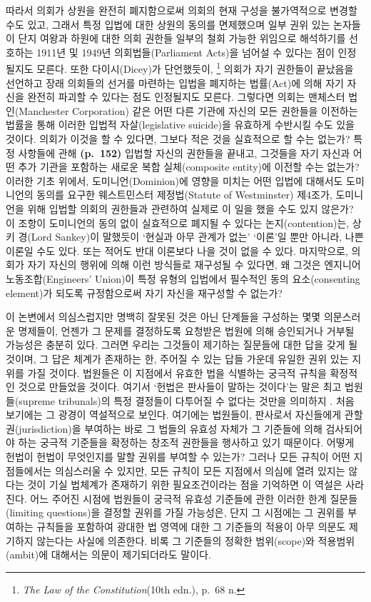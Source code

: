 따라서 의회가 상원을 완전히 폐지함으로써 의회의 현재 구성을 불가역적으로
변경할 수도 있고, 그래서 특정 입법에 대한 상원의 동의를 면제했으며 일부
권위 있는 논자들이 단지 여왕과 하원에 대한 의회 권한들 일부의 철회
가능한 위임으로 해석하기를 선호하는 1911년 및 1949년 의회법들(Parliament
Acts)을 넘어설 수 있다는 점이 인정될지도 모른다. 또한 다이시(Dicey)가
단언했듯이, \footnote{\emph{The Law of the Constitution}(10th edn.),
  p.~68 n.} 의회가 자기 권한들이 끝났음을 선언하고 장래 의회들의 선거를
마련하는 입법을 폐지하는 법률(Act)에 의해 자기 자신을 완전히 파괴할 수
있다는 점도 인정될지도 모른다. 그렇다면 의회는 맨체스터 법인(Manchester
Corporation) 같은 어떤 다른 기관에 자신의 모든 권한들을 이전하는 법률을
통해 이러한 입법적 자살(legislative suicide)을 유효하게 수반시킬 수도
있을 것이다. 의회가 이것을 할 수 있다면, 그보다 적은 것을 실효적으로 할
수는 없는가? 특정 사항들에 관해 \textbf{(p.~152)} 입법할 자신의 권한들을
끝내고, 그것들을 자기 자신과 어떤 추가 기관을 포함하는 새로운 복합
실체(composite entity)에 이전할 수는 없는가? 이러한 기초 위에서,
도미니언(Dominion)에 영향을 미치는 어떤 입법에 대해서도 도미니언의
동의를 요구한 웨스트민스터 제정법(Statute of Westminster) 제4조가,
도미니언을 위해 입법할 의회의 권한들과 관련하여 실제로 이 일을 했을 수도
있지 않은가? 이 조항이 도미니언의 동의 없이 실효적으로 폐지될 수 있다는
논지(contention)는, 상키 경(Lord Sankey)이 말했듯이 ‘현실과 아무 관계가
없는’ ‘이론’일 뿐만 아니라, 나쁜 이론일 수도 있다. 또는 적어도 반대
이론보다 나을 것이 없을 수 있다. 마지막으로, 의회가 자기 자신의 행위에
의해 이런 방식들로 재구성될 수 있다면, 왜 그것은 엔지니어
노동조합(Engineers' Union)이 특정 유형의 입법에서 필수적인 동의
요소(consenting element)가 되도록 규정함으로써 자기 자신을 재구성할 수
없는가?

이 논변에서 의심스럽지만 명백히 잘못된 것은 아닌 단계들을 구성하는 몇몇
의문스러운 명제들이, 언젠가 그 문제를 결정하도록 요청받은 법원에 의해
승인되거나 거부될 가능성은 충분히 있다. 그러면 우리는 그것들이 제기하는
질문들에 대한 답을 갖게 될 것이며, 그 답은 체계가 존재하는 한, 주어질 수
있는 답들 가운데 유일한 권위 있는 지위를 가질 것이다. 법원들은 이
지점에서 유효한 법을 식별하는 궁극적 규칙을 확정적인 것으로 만들었을
것이다. 여기서 ‘헌법은 판사들이 말하는 것이다’는 말은 최고
법원들(supreme tribunals)의 특정 결정들이 다투어질 수 없다는 것만을
의미하지 . 처음 보기에는 그 광경이 역설적으로 보인다.
여기에는 법원들이, 판사로서 자신들에게 관할권(jurisdiction)을 부여하는
바로 그 법들의 유효성 자체가 그 기준들에 의해 검사되어야 하는 궁극적
기준들을 확정하는 창조적 권한들을 행사하고 있기 때문이다. 어떻게 헌법이
헌법이 무엇인지를 말할 권위를 부여할 수 있는가? 그러나 모든 규칙이 어떤
지점들에서는 의심스러울 수 있지만, 모든 규칙이 모든 지점에서 의심에 열려
있지는 않다는 것이 기실 법체계가 존재하기 위한 필요조건이라는 점을
기억하면 이 역설은 사라진다. 어느 주어진 시점에 법원들이 궁극적 유효성
기준들에 관한 이러한 한계 질문들(limiting questions)을 결정할 권위를
가질 가능성은, 단지 그 시점에는 그 권위를 부여하는 규칙들을 포함하여
광대한 법 영역에 대한 그 기준들의 적용이 아무 의문도 제기하지 않는다는
사실에 의존한다. 비록 그 기준들의 정확한 범위(scope)와 적용범위(ambit)에
대해서는 의문이 제기되더라도 말이다.

